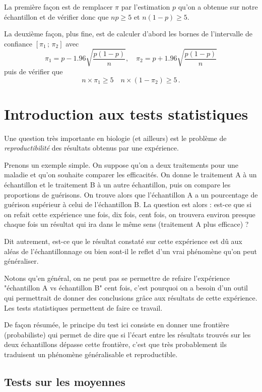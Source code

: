 \documentclass[12pt, a4paper]{book}
\numberwithin{equation}{section}
\begin{document}
La première façon est de remplacer $\pi$ par l'estimation $p$ qu'on a obtenue sur notre échantillon 
et de  vérifier donc que $np\geq 5$ et $n(1-p)\geq 5$.

La deuxième façon, plus fine, est de calculer d'abord les bornes de l'intervalle de confiance $[\pi_1\,;\,\pi_2]$ avec
$$
\pi_1 = p -1.96 \sqrt{\frac{p(1-p)}{n}}, \quad
\pi_2 = p +1.96 \sqrt{\frac{p(1-p)}{n}}
$$
puis de vérifier que
$$
n\times\pi_1 \geq  5 \quad n\times (1-\pi_2) \geq  5\,.
$$




\chapter{Introduction aux tests statistiques}
 
Une question très importante en biologie (et ailleurs) est le problème de {\it reproductibilité} 
des résultats obtenus par une expérience. 

Prenons un exemple simple. On suppose qu'on a deux traitements pour une 
maladie et qu'on souhaite comparer les efficacités. On donne le traitement A à un échantillon et le traitement B à un autre échantillon, puis on compare les proportions de guérisons.
On trouve alors que l'échantillon A a un pourcentage de guérison supérieur à celui de l'échantillon B.
La question est alors : est-ce que si on refait cette expérience une fois, dix fois, cent fois, on trouvera
environ presque chaque fois un résultat qui ira dans le même sens (traitement A plus efficace) ?

Dit autrement, est-ce que le résultat constaté sur cette expérience est dû aux aléas de l'échantillonnage
ou bien sont-il le reflet d'un vrai phénomène qu'on peut généraliser.

Notons qu'en général, on ne peut pas se permettre de refaire l'expérience "échantillon A vs échantillon B" cent fois, c'est pourquoi on a besoin d'un outil qui permettrait de donner des conclusions grâce 
aux résultats de cette expérience.  Les tests statistiques permettent de faire ce travail.

De façon résumée, le principe du test ici consiste en donner une frontière (probabiliste) qui permet de dire que si l'écart 
entre les résultats trouvés sur les deux échantillons dépasse cette frontière, c'est que très probablement
ils traduisent un phénomène généralisable et reproductible.

\section{Tests sur les moyennes} 
\end{document}
